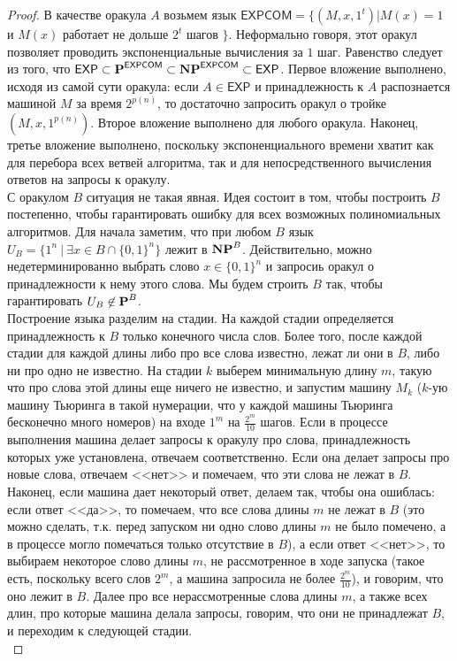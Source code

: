  \begin{proof}
В качестве оракула $A$ возьмем язык $\mathsf{EXPCOM} = \{(M, x, 1^t)| M(x) = 1$ и $M(x)$ работает не дольше $2^t$ шагов $\}$. Неформально говоря, этот оракул позволяет проводить экспоненциальные вычисления за $1$ шаг. Равенство следует из того, что $\mathsf{EXP} \subset \textbf{P}^{\mathsf{EXPCOM}} \subset \textbf{NP}^{\mathsf{EXPCOM}} \subset \mathsf{EXP}$. Первое вложение выполнено, исходя из самой сути  оракула: если $A \in \mathsf{EXP}$ и принадлежность к $A$ распознается машиной $M$ за время $2^{p(n)}$, то достаточно запросить оракул о тройке $(M, x, 1^{p(n)})$. Второе вложение выполнено для любого оракула. Наконец, третье вложение выполнено, поскольку экспоненциального времени хватит как для перебора всех ветвей алгоритма, так и для непосредственного вычисления ответов на запросы к оракулу.\\

С оракулом $B$ ситуация не такая явная. Идея состоит в том, чтобы построить $B$ постепенно, чтобы гарантировать ошибку для всех возможных полиномиальных алгоритмов. Для начала заметим, что при любом $B$ язык $U_B = \{1^n \ | \ \exists x \in B \cap \{0, 1\}^n \}$ лежит в $\textbf{NP}^B$. Действительно, можно недетерминированно выбрать слово $x \in \{0, 1\}^n$ и запросиь оракул о принадлежности к нему этого слова. Мы будем строить $B$ так, чтобы гарантировать $U_B \not\in \textbf{P}^B$.\\

Построение языка разделим на стадии. На каждой стадии определяется принадлежность к $B$ только конечного числа слов. Более того, после каждой стадии для каждой длины либо про все слова известно, лежат ли они в $B$, либо ни про одно не известно. На стадии $k$ выберем минимальную длину $m$, такую что про слова этой длины еще ничего не известно, и запустим машину $M_k$ ($k$-ую машину Тьюринга в такой нумерации, что у каждой машины Тьюринга бесконечно много номеров) на входе $1^m$ на $\frac{2^m}{10}$ шагов. Если в процессе выполнения машина делает запросы к оракулу про слова, принадлежность которых уже установлена, отвечаем соответственно. Если она делает запросы про новые слова, отвечаем <<нет>> и помечаем, что эти слова не лежат в $B$. Наконец, если машина дает некоторый ответ, делаем так, чтобы она ошиблась: если ответ <<да>>, то помечаем, что все слова длины $m$ не лежат в $B$ (это можно сделать, т.к. перед запуском ни одно слово длины $m$ не было помечено, а в процессе могло помечаться только отсутствие в $B$), а если ответ <<нет>>, то выбираем некоторое слово длины $m$, не рассмотренное в ходе запуска (такое есть, поскольку всего слов $2^m$, а машина запросила не более $\frac{2^m}{10}$), и говорим, что оно лежит в $B$. Далее про все нерассмотренные слова длины $m$, а также всех длин, про которые машина делала запросы, говорим, что они не принадлежат $B$, и переходим к следующей стадии.\\


\end{proof}
